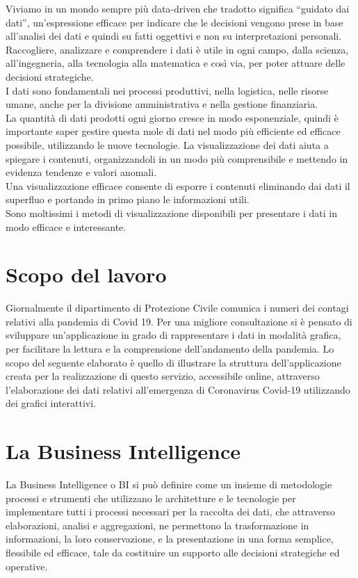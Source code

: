
Viviamo in un mondo sempre più data-driven che tradotto significa “guidato dai dati”, un’espressione efficace per indicare che le decisioni vengono prese in base all’analisi dei dati e quindi su fatti oggettivi e non su interpretazioni personali.
Raccogliere, analizzare e comprendere i dati è utile in ogni campo, dalla scienza, all'ingegneria, alla tecnologia alla matematica e così via, per poter attuare delle decisioni strategiche.\\
I dati sono fondamentali nei processi produttivi, nella logistica, nelle risorse umane, anche per la divisione amministrativa e nella gestione finanziaria.\\
La quantità di dati prodotti ogni giorno cresce in modo esponenziale, quindi è importante saper gestire questa mole di dati nel modo più efficiente ed efficace possibile, utilizzando le nuove tecnologie.
La visualizzazione dei dati aiuta a spiegare i contenuti, organizzandoli in un modo più comprensibile e mettendo in evidenza tendenze e valori anomali.\\
Una visualizzazione efficace consente di esporre i contenuti eliminando dai dati il superfluo e portando in primo piano le informazioni utili.\\
Sono moltissimi i metodi di visualizzazione disponibili per presentare i dati in modo efficace e interessante.


\section{Scopo del lavoro}

Giornalmente il dipartimento di Protezione Civile comunica i numeri dei contagi relativi alla pandemia di Covid 19.
Per una migliore consultazione si è pensato di sviluppare un’applicazione in grado di rappresentare i dati in modalità grafica, per facilitare la lettura e la comprensione dell’andamento della pandemia.
Lo scopo del seguente elaborato è quello di illustrare la struttura dell'applicazione creata per la realizzazione di questo servizio, accessibile online, attraverso l’elaborazione dei dati relativi all’emergenza di Coronavirus Covid-19 utilizzando dei grafici interattivi.

\section{La Business Intelligence}
La Business Intelligence o BI si può definire come un insieme di metodologie processi e strumenti che utilizzano le architetture e le tecnologie per implementare tutti i processi necessari per la raccolta dei dati, che attraverso elaborazioni, analisi e aggregazioni, ne permettono la trasformazione in informazioni, la loro conservazione, e la presentazione in una forma semplice, flessibile ed efficace, tale da costituire un supporto alle decisioni strategiche ed operative.
 
